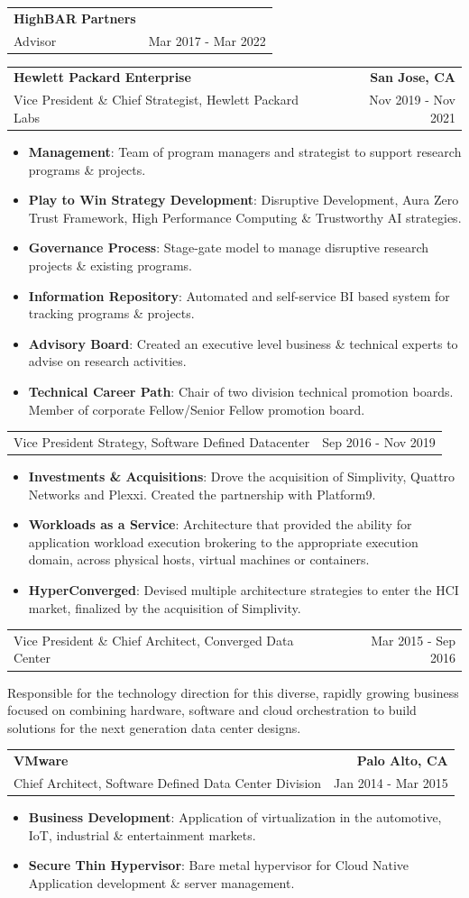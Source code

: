 \documentclass[letterpaper,11pt]{article}
\makeatletter
\newcommand{\resumeCompanyHeading}[4]{
  \vspace{-1pt}
    \item
    \begin{tabular*}{1.0\textwidth}[t]{l@{\extracolsep{\fill}}r}
      \textbf{#1} & \textbf{#2} \\
      {#3} & {#4}
    \end{tabular*}\vspace{-10pt}
  }
\newcommand{\resumeCompanyPositionHeading}[2]{
      \item
      \begin{tabular*}{1.0\textwidth}{l@{\extracolsep{\fill}}r}
        {#1} & {#2}
    \end{tabular*}\vspace{-10pt}
}
\newcommand{\resumeJobDescription}[1][]{
    \vspace{-1pt}\par{#1}
}
\newcommand{\resumeItem}[2]{\item{{\textbf{\small#1}}: {\small#2 \vspace{-1pt}}}}
\newcommand{\resumeItemListStart}{\begin{itemize}}
\newcommand{\resumeItemListEnd}{\end{itemize}}\vspace{-10pt}
\makeatother
\begin{document}
      \resumeCompanyHeading
          {HighBAR Partners}{}
          {Advisor}
          {Mar 2017 - Mar 2022}

      \resumeCompanyHeading
          {Hewlett Packard Enterprise}
          {San Jose, CA}
          {Vice President \& Chief Strategist, Hewlett Packard Labs}
          {Nov 2019 - Nov 2021}
            \resumeItemListStart
                \resumeItem{Management}{Team of program managers and strategist to support research programs \& projects.}
                \resumeItem{Play to Win Strategy Development}{Disruptive Development, Aura Zero Trust Framework, High Performance Computing \& Trustworthy AI strategies.}
                \resumeItem{Governance Process}{Stage-gate model to manage disruptive research projects \& existing programs.}
                \resumeItem{Information Repository}{Automated and self-service BI based system for tracking programs \& projects.}
                \resumeItem{Advisory Board}{Created an executive level business \& technical experts to advise on research activities.}
                \resumeItem{Technical Career Path}{Chair of two division technical promotion boards. Member of corporate Fellow/Senior Fellow promotion board.}
            \resumeItemListEnd

          \resumeCompanyPositionHeading
            {Vice President Strategy, Software Defined Datacenter}
            {Sep 2016 - Nov 2019}
            \resumeItemListStart
                \resumeItem{Investments \& Acquisitions}{Drove the acquisition of Simplivity, Quattro Networks and Plexxi. Created the partnership with Platform9.}
                \resumeItem{Workloads as a Service}{Architecture that provided the ability for application workload execution brokering to the appropriate execution domain, across
                           physical hosts, virtual machines or containers.}
                \resumeItem{HyperConverged}{Devised multiple architecture strategies to enter the HCI market, finalized by the acquisition of Simplivity.}
            \resumeItemListEnd

          \resumeCompanyPositionHeading
            {Vice President \& Chief Architect, Converged Data Center}
            {Mar 2015 - Sep 2016}
            \resumeJobDescription{Responsible for the technology direction for this diverse, rapidly growing business focused on combining hardware, software
              and cloud orchestration to build solutions for the next generation data center designs.}

        \resumeCompanyHeading
            {VMware}
            {Palo Alto, CA}
            {Chief Architect, Software Defined Data Center Division}
            {Jan 2014 - Mar 2015}
            \resumeItemListStart
                \resumeItem{Business Development}{Application of virtualization in the automotive, IoT, industrial \& entertainment markets.}
                \resumeItem{Secure Thin Hypervisor}{Bare metal hypervisor for Cloud Native Application development \& server management.}
            \resumeItemListEnd
\end{document}
